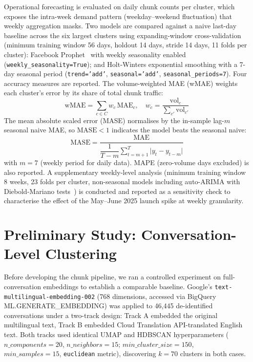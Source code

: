 \documentclass[conference]{IEEEtran}
\begin{document}
Operational forecasting is evaluated on daily chunk counts per cluster, which exposes the intra-week demand pattern (weekday--weekend fluctuation) that weekly aggregation masks. Two models are compared against a naive last-day baseline across the six largest clusters using expanding-window cross-validation (minimum training window 56 days, holdout 14 days, stride 14 days, 11 folds per cluster): Facebook Prophet~\cite{taylor2018forecasting} with weekly seasonality enabled (\texttt{weekly\_seasonality=True}); and Holt-Winters exponential smoothing with a 7-day seasonal period (\texttt{trend='add'}, \texttt{seasonal='add'}, \texttt{seasonal\_periods=7}). Four accuracy measures are reported. The volume-weighted MAE (wMAE) weights each cluster's error by its share of total chunk traffic:
\begin{equation}
  \mathrm{wMAE} = \sum_{c \in C} w_c\,\mathrm{MAE}_c,
  \quad w_c = \frac{\mathrm{vol}_c}{\displaystyle\sum_{c'} \mathrm{vol}_{c'}}
  \label{eq:wmae}
\end{equation}
The mean absolute scaled error (MASE) normalises by the in-sample lag-$m$ seasonal naive MAE, so $\mathrm{MASE}{<}1$ indicates the model beats the seasonal naive:
\begin{equation}
  \mathrm{MASE} =
  \frac{\mathrm{MAE}}
       {\dfrac{1}{T-m}\displaystyle\sum_{t=m+1}^{T}\bigl|y_t - y_{t-m}\bigr|}
  \label{eq:mase}
\end{equation}
with $m{=}7$ (weekly period for daily data). MAPE (zero-volume days excluded) is also reported. A supplementary weekly-level analysis (minimum training window 8 weeks, 23 folds per cluster, non-seasonal models including auto-ARIMA with Diebold-Mariano tests~\cite{diebold1995dm}) is conducted and reported as a sensitivity check to characterise the effect of the May--June 2025 launch spike at weekly granularity.

\section{Preliminary Study: Conversation-Level Clustering}
\label{sec:baseline}
\label{sec:prelim}

Before developing the chunk pipeline, we ran a controlled experiment on full-conversation embeddings to establish a comparable baseline. Google's \texttt{text-multilingual-embedding-002} (768 dimensions, accessed via BigQuery ML.GENERATE\_EMBEDDING) was applied to 46{,}445 de-identified conversations under a two-track design: Track A embedded the original multilingual text, Track B embedded Cloud Translation API-translated English text. Both tracks used identical UMAP and HDBSCAN hyperparameters ($n\_components{=}20$, $n\_neighbors{=}15$; $min\_cluster\_size{=}150$, $min\_samples{=}15$, \texttt{euclidean} metric), discovering $k{=}70$ clusters in both cases.
\end{document}
